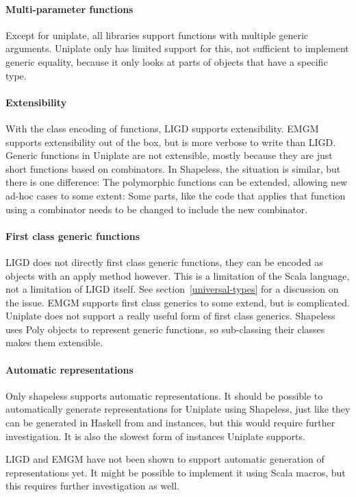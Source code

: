 \paragraph{Multi-parameter functions}
Except for uniplate, all libraries support functions with multiple generic
arguments. Uniplate only has limited support for this, not sufficient to
implement generic equality, because it only looks at parts of objects that
have a specific type.

\paragraph{Extensibility}
With the class encoding of functions, LIGD supports
extensibility. EMGM supports extensibility out of the box, but is more verbose
to write than LIGD. Generic functions in Uniplate are not extensible, mostly
because they are just short functions based on combinators. In Shapeless, the
situation is similar, but there is one difference: The polymorphic functions
can be extended, allowing new ad-hoc cases to some extent: Some parts, like
the code that applies that function using a combinator needs to be changed to
include the new combinator.

\paragraph{First class generic functions}
LIGD does not directly first class generic functions, they can be encoded as
objects with an apply method however. This is a limitation of the Scala
language, not a limitation of LIGD itself. See section~\ref{universal-types}
for a discussion on the issue. EMGM supports first class generics to some
extend, but is complicated. Uniplate does not support a really useful form
of first class generics. Shapeless uses Poly objects to represent generic
functions, so sub-classing their classes makes them extensible.

\paragraph{Automatic representations}
Only shapeless supports automatic representations. It should be possible to
automatically generate representations for Uniplate using Shapeless,
just like they can be generated in Haskell from  and 
instances, but this would require further investigation. It is also the slowest
form of instances Uniplate supports.

LIGD and EMGM have not been shown to support automatic generation of
representations yet. It might be possible to implement it using Scala
macros, but this requires further investigation as well.

